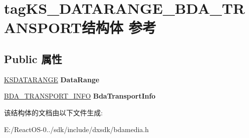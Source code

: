 \hypertarget{structtag_k_s___d_a_t_a_r_a_n_g_e___b_d_a___t_r_a_n_s_p_o_r_t}{}\section{tag\+K\+S\+\_\+\+D\+A\+T\+A\+R\+A\+N\+G\+E\+\_\+\+B\+D\+A\+\_\+\+T\+R\+A\+N\+S\+P\+O\+R\+T结构体 参考}
\label{structtag_k_s___d_a_t_a_r_a_n_g_e___b_d_a___t_r_a_n_s_p_o_r_t}
\subsection*{Public 属性}
\begin{DoxyCompactItemize}
\item 
\mbox{\label{structtag_k_s___d_a_t_a_r_a_n_g_e___b_d_a___t_r_a_n_s_p_o_r_t_a83a8f1274777969b5128d35660382447}} 
\hyperlink{struct_k_s_d_a_t_a_f_o_r_m_a_t}{K\+S\+D\+A\+T\+A\+R\+A\+N\+GE} {\bfseries Data\+Range}
\item 
\mbox{\label{structtag_k_s___d_a_t_a_r_a_n_g_e___b_d_a___t_r_a_n_s_p_o_r_t_a454e43247fec8e9ae9bf02c312589521}} 
\hyperlink{structtag_b_d_a___t_r_a_n_s_p_o_r_t___i_n_f_o}{B\+D\+A\+\_\+\+T\+R\+A\+N\+S\+P\+O\+R\+T\+\_\+\+I\+N\+FO} {\bfseries Bda\+Transport\+Info}
\end{DoxyCompactItemize}


该结构体的文档由以下文件生成\+:\begin{DoxyCompactItemize}
\item 
E\+:/\+React\+O\+S-\/0../sdk/include/dxsdk/bdamedia.\+h\end{DoxyCompactItemize}
